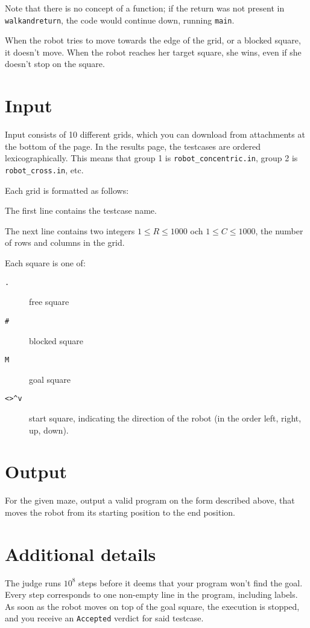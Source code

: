 Note that there is no concept of a function; if the return was not present in \texttt{walkandreturn}, the code would continue down, running \texttt{main}.

When the robot tries to move towards the edge of the grid, or a blocked square, it doesn't move. When the robot reaches her target square, she wins, even if she doesn't stop on the square.

\section*{Input}
Input consists of 10 different grids, which you can download from attachments at the bottom of the page. In the results page,
the testcases are ordered lexicographically. This means that group 1 is \texttt{robot\_concentric.in}, group 2 is \texttt{robot\_cross.in}, etc.

Each grid is formatted as follows:

The first line contains the testcase name.

The next line contains two integers $1 \le R \le 1000$ och $1 \le C \le 1000$, the number of rows and columns in the grid.

Each square is one of:
\begin{description}
  \item[\texttt{.}] free square
  \item[\texttt{\#}] blocked square
  \item[\texttt{M}] goal square
  \item[\texttt{<>\textasciicircum{}v}] start square, indicating the direction of the robot (in the order left, right, up, down).
\end{description}

\section*{Output}
For the given maze, output a valid program on the form described above, that moves the robot from its starting position to the end position.

\section*{Additional details}
The judge runs $10^8$ steps before it deems that your program won't find the goal.
Every step corresponds to one non-empty line in the program, including labels. As soon as the robot
moves on top of the goal square, the execution is stopped, and you receive an \texttt{Accepted} verdict
for said testcase.

